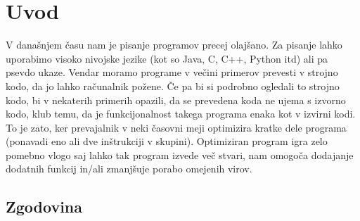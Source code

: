 \documentclass[a4paper, 12pt]{book}
\newcommand{\BibTeX}{{\sc Bib}\TeX}
\begin{document}
\chapter{Uvod}
%
%
%
V današnjem času nam je pisanje programov precej olajšano. Za pisanje lahko uporabimo visoko nivojske jezike (kot so Java, C, C++, Python itd) ali pa psevdo ukaze. Vendar moramo programe v večini primerov prevesti v strojno kodo, da jo lahko računalnik požene. Če pa bi si podrobno ogledali to strojno kodo, bi v nekaterih primerih opazili, da se prevedena koda ne ujema s izvorno kodo, klub temu, da je funkcijonalnost takega programa enaka kot v izvirni kodi. To je zato, ker prevajalnik v neki časovni meji optimizira kratke dele programa (ponavadi eno ali dve inštrukciji v skupini). Optimiziran program igra zelo pomebno vlogo saj lahko tak program izvede več stvari, nam omogoča dodajanje dodatnih funkcij in/ali zmanjšuje porabo omejenih virov.
\section{Zgodovina}
\end{document}

